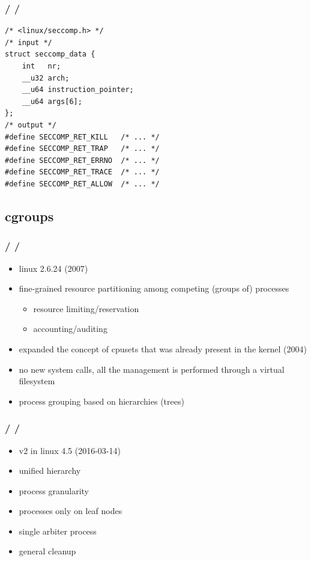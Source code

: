 \documentclass{beamer}
\newcommand{\autotitle}
{\frametitle{
    \secname
    \ifx\insertsubsection\empty
    \else
        /\subsecname
        \ifx\insertsubsubsection\empty\else/\subsubsecname\fi
    \fi}}
\begin{document}
\begin{frame}[fragile]
    \autotitle
    \begin{verbatim}
/* <linux/seccomp.h> */
/* input */
struct seccomp_data {
    int   nr;
    __u32 arch;
    __u64 instruction_pointer;
    __u64 args[6];
};
/* output */
#define SECCOMP_RET_KILL   /* ... */
#define SECCOMP_RET_TRAP   /* ... */
#define SECCOMP_RET_ERRNO  /* ... */
#define SECCOMP_RET_TRACE  /* ... */
#define SECCOMP_RET_ALLOW  /* ... */
    \end{verbatim}
\end{frame}

\subsection{cgroups}

\begin{frame}
    \autotitle
    \begin{itemize}
        \item linux 2.6.24 (2007)
        \item
            fine-grained resource partitioning among competing (groups of)
            processes
        \begin{itemize}
            \item resource limiting/reservation
            \item accounting/auditing
        \end{itemize}
        \item
            expanded the concept of cpusets that was already present in the
            kernel (2004)
        \item
            no new system calls, all the management is performed through a
            virtual filesystem
        \item process grouping based on hierarchies (trees)
    \end{itemize}
\end{frame}

\begin{frame}
    \autotitle
    \begin{itemize}
        \item v2 in linux 4.5 (2016-03-14)
        \item unified hierarchy
        \item process granularity
        \item processes only on leaf nodes
        \item single arbiter process
        \item general cleanup
    \end{itemize}
\end{frame}
\end{document}
